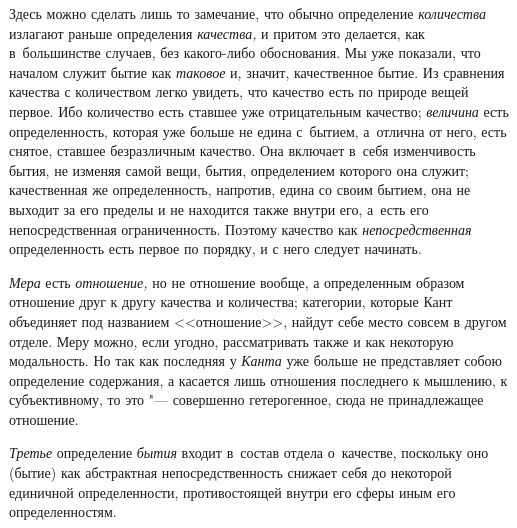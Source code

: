 Здесь можно сделать лишь то замечание, что обычно определение {\em количества}
излагают раньше определения {\em качества,} и притом это делается, как
в~большинстве случаев, без какого-либо обоснования. Мы уже показали, что
началом служит бытие как {\em таковое} и, значит, качественное бытие. Из
сравнения качества с количеством легко увидеть, что качество есть по природе
вещей первое. Ибо количество есть ставшее уже отрицательным качество;
{\em величина} есть определенность, которая уже больше не едина с~бытием,
а~отлична от него, есть снятое, ставшее безразличным качество. Она включает
в~себя изменчивость бытия, не изменяя самой вещи, бытия, определением которого
она служит; качественная же определенность, напротив, едина со своим бытием,
она не выходит за его пределы и не находится также внутри его, а~есть его
непосредственная ограниченность. Поэтому качество как {\em непосредственная}
определенность есть первое по порядку, и с него следует начинать.

{\em Мера} есть {\em отношение,} но не отношение вообще, а определенным образом
отношение друг к другу качества и количества; категории, которые Кант
объединяет под названием <<отношение>>, найдут себе место совсем в другом
отделе. Меру можно, если угодно, рассматривать также и как некоторую
модальность. Но так как последняя у {\em Канта} уже больше не представляет
собою определение содержания, а касается лишь отношения последнего к мышлению,
к субъективному, то это "--- совершенно гетерогенное, сюда не принадлежащее
отношение.

{\em Третье} определение {\em бытия} входит в~состав отдела о~качестве,
поскольку оно (бытие) как абстрактная непосредственность снижает себя до
некоторой единичной определенности, противостоящей внутри его сферы иным
его определенностям.

\bigskip
